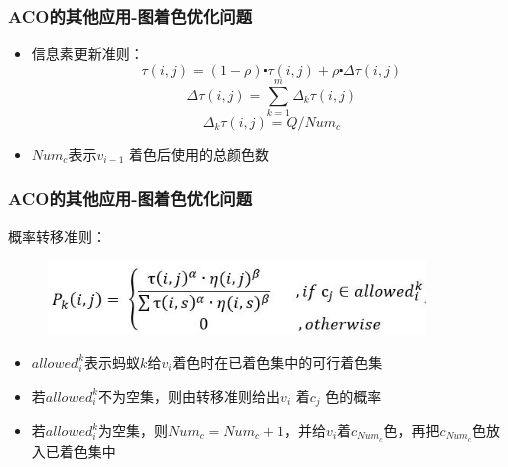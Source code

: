 \begin{frame}
	\frametitle{ACO的其他应用-图着色优化问题}
	\begin{itemize}
		\item {信息素更新准则：
		$$
		\tau (i,j)= (1-\rho)\centerdot \tau(i,j)+\rho \centerdot \Delta \tau(i,j)
		$$
		$$
		\Delta \tau(i,j) = \sum_{k=1}^{m}\Delta_k \tau(i,j)
		$$
		$$
		\Delta_k \tau(i,j) = Q/Num_c
		$$}
		\item {$Num_c$表示$v_{i-1}$ 着色后使用的总颜色数}
	\end{itemize}
\end{frame}


\begin{frame}
	\frametitle{ACO的其他应用-图着色优化问题}
	概率转移准则：
	\begin{figure}[htbp]
		\centering
		\includegraphics[width=10cm]{pic/ant7.jpg}
	\end{figure}

	\begin{itemize}
		\item {$allowed_i^k$表示蚂蚁$k$给$v_i$着色时在已着色集中的可行着色集}
		\item {若$allowed_i^k$不为空集，则由转移准则给出$v_i$ 着$c_j$ 色的概率}
		\item {若$allowed_i^k$为空集，则$Num_c= Num_c+1$，并给$v_i$着$c_{Num_c}$色，再把$c_{Num_c}$色放入已着色集中}
	\end{itemize}

\end{frame}